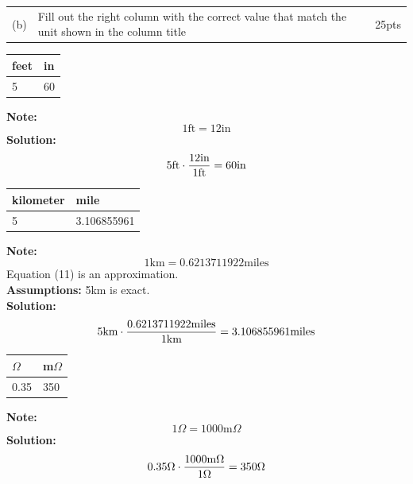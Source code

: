 \documentclass{article}
\newcommand{\problemstatement}[3]{
\noindent
\begin{tabular}{ m{0.5cm} m{42em} m{0.5cm} }
	({#1}) & {#2} & {#3}pts
\end{tabular}
}
\begin{document}
\newpage
\problemstatement{b}{Fill out the right column with the correct value that match the unit shown in the column title}{25}
\begin{center}
	\begin{tabular}{ | w{c}{2cm} | w{c}{2cm} | }
		\hline
		feet & in \\
		    & 60 \\
		\hline
	\end{tabular}
\end{center}
\begin{addmargin}[1.5cm]{0em}
	\noindent\textbf{Note:}
	\begin{equation}
		1 \text{ft} = 12 \text{in}
	\end{equation}
	\noindent\textbf{Solution:}
	\[ 5 \text{ft} \cdot { 12 \text{in} \over 1 \text{ft} } = 60 \text{in} \]
\end{addmargin}
\begin{center}
	\begin{tabular}{ | w{c}{2cm} | w{c}{2cm} | }
		\hline
		kilometer & mile \\
		    &  3.106855961 \\
		\hline
	\end{tabular}
\end{center}
\begin{addmargin}[1.5cm]{0em}
	\noindent\textbf{Note:}
	\begin{equation}
		1 \text{km} =  0.6213711922 \text{miles}
	\end{equation}
	Equation (11) is an approximation. \\
	\noindent\textbf{Assumptions:} 5km is exact. \\
	\noindent\textbf{Solution:}
	\[ 5 \text{km} \cdot {  0.6213711922 \text{miles} \over  1 \text{km} } =  3.106855961 \text{miles} \]
\end{addmargin}
\begin{center}
	\begin{tabular}{ | w{c}{2cm} | w{c}{2cm} | }
		\hline
		$\Omega$ & m$\Omega$ \\     &  350 \\ \hline
	\end{tabular}
\end{center}
\begin{addmargin}[1.5cm]{0em}
	\noindent\textbf{Note:}
	\begin{equation}
		1 \Omega = 1000 \text{m} \Omega
	\end{equation}
	\noindent\textbf{Solution:}
	\[ 0.35 \Omega \cdot { 1000 \text{m} \Omega \over 1 \Omega } = 350 \Omega \]
\end{addmargin}
\end{document}

